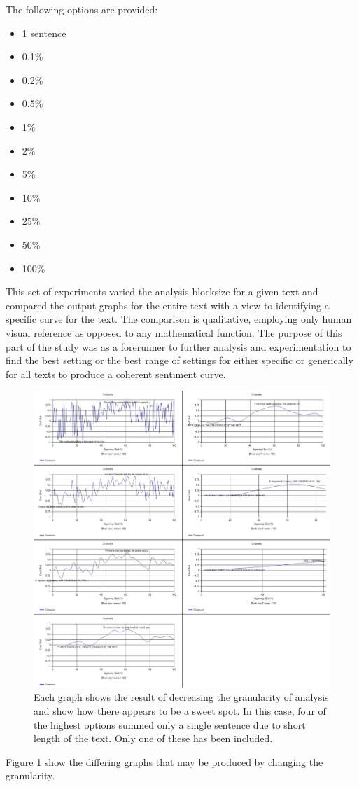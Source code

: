 \documentclass{article}
\begin{document}
        The following options are provided:
        \begin{itemize}
            \item 1 sentence
            \item 0.1\%
            \item 0.2\%
            \item 0.5\%
            \item 1\%
            \item 2\%
            \item 5\%
            \item 10\%
            \item 25\%
            \item 50\%
            \item 100\%
        \end{itemize}
        This set of experiments varied the analysis blocksize for a given text and compared the output graphs for the entire text with a view to identifying a specific curve for the text. The comparison is qualitative, employing only human visual reference as opposed to any mathematical function. The purpose of this part of the study was as a forerunner to further analysis and experimentation to find the best setting or the best range of settings for either specific or generically for all texts to produce a coherent sentiment curve.
        \begin{figure}
            \includegraphics[width=1\textwidth]{Figures/Blocksize/Cinderella/cinderellaGran}
            \centering
            \caption{Each graph shows the result of decreasing the granularity of analysis and show how there appears to be a sweet spot. In this case, four of the highest options summed only a single sentence due to short length of the text. Only one of these has been included.}
            \label{fig:cinderellaGran}
        \end{figure}
        Figure \ref{fig:cinderellaGran} show the differing graphs that may be produced by changing the granularity.
\end{document}

